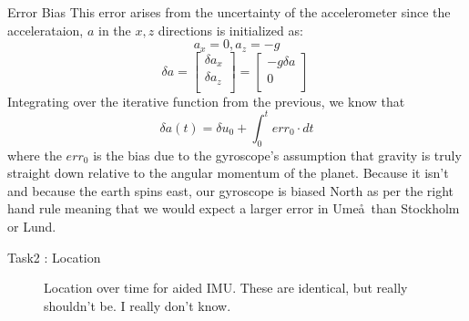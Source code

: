 \documentclass[10pt]{beamer}
\theoremstyle{definition}
\begin{document}
\begin{frame}{Error Bias}
    This error arises from the uncertainty of the accelerometer since the accelerataion, $a$ in the $x,z$ directions is initialized as:
    $$
    a_x = 0, a_z = -g
    $$
    $$
    \delta a = 
    \begin{bmatrix}
        \delta a_x \\
        \delta a_z \\
    \end{bmatrix} = 
    \begin{bmatrix} 
        -g \delta a \\
        0           \\
    \end{bmatrix}
    \
    $$
    Integrating over the iterative function from the previous, we know that
    $$
    \delta a(t) = \delta u_0 + \int_0^t err_0 \cdot dt
    $$
    where the $err_0$ is the bias due to the gyroscope's assumption that gravity is truly straight down relative to the angular momentum of the planet. Because it isn't and because the earth spins east, our gyroscope is biased North as per the right hand rule meaning that we would expect a larger error in Ume\aa~than Stockholm or Lund.
\end{frame}
\begin{frame}{Task2 : Location}
\begin{figure}

    \caption{Location over time for aided IMU. These are identical, but really shouldn't be. I really don't know.}
    
\end{figure}
\begin{figure}
    
\end{figure}

\end{frame}
\end{document}
